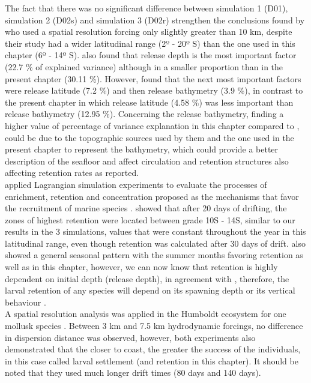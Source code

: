 The fact that there was no significant difference between simulation 1 (D01), simulation 2 (D02s) and simulation 3 (D02r) strengthen the conclusions found by \citep{BrocLett2008} who used a spatial resolution forcing only slightly greater than 10 km, despite their study had a wider latitudinal range (2º - 20º S) than the one used in this chapter (6º - 14º S). \cite{BrocLett2008} also found that release depth is the most important factor (22.7 \% of explained variance) although in a smaller proportion than in the present chapter (30.11 \%). However, \cite{BrocLett2008} found that the next most important factors were release latitude (7.2 \%) and then release bathymetry (3.9 \%), in contrast to the present chapter in which release latitude (4.58 \%) was less important than release bathymetry (12.95 \%). Concerning the release bathymetry, finding a higher value of percentage of variance explanation in this chapter compared to \cite{BrocLett2008}, could be due to the topographic sources \citep{SmitSand1997} used by them and the one used in the present chapter \citep{BeckSand2009} to represent the bathymetry, which could provide a better description of the seafloor and affect circulation and retention structures also affecting retention rates as \cite{RojaLand2014} reported.\\

\cite{LettPenv2007} applied Lagrangian simulation experiments to evaluate the processes of enrichment, retention and concentration proposed as the mechanisms that favor the recruitment of marine species \citep{Baku1998, Baku2010}. \cite{LettPenv2007} showed that after 20 days of drifting, the zones of highest retention were located between grade 10\textdegree S - 14\textdegree S, similar to our results in the 3 simulations, values that were constant throughout the year in this latitudinal range, even though retention was calculated after 30 days of drift. \cite{LettPenv2007} also showed a general seasonal pattern with the summer months favoring retention as well as in this chapter, however, we can now know that retention is highly dependent on initial depth (release depth), in agreement with \cite{BrocLett2008}, therefore, the larval retention of any species will depend on its spawning depth or its vertical behaviour \citep{OspiPara2012}.\\

A spatial resolution analysis was applied in the Humboldt ecosystem for one mollusk species \citep{GaraKapl2014}. Between 3 km and 7.5 km hydrodynamic forcings, no difference in dispersion distance was observed, however, both experiments also demonstrated that the closer to coast, the greater the success of the individuals, in this case called larval settlement (and retention in this chapter). It should be noted that they used much longer drift times (80 days and 140 days).\\

